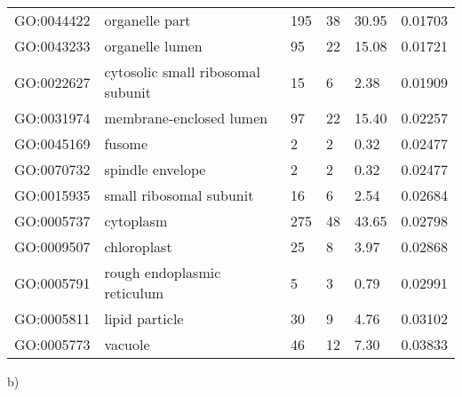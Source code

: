 \documentclass[10pt]{bmc_article}
\newenvironment{bmcformat}{\begin{raggedright}\baselineskip20pt\sloppy\setboolean{publ}{false}}{\end{raggedright}\baselineskip20pt\sloppy}
\begin{document}
\begin{bmcformat}
\begin{longtable}{lp{3cm}llll}
  GO:0044422 & organelle part & 195 &  38 & 30.95 & 0.01703 \\ 
  GO:0043233 & organelle lumen &  95 &  22 & 15.08 & 0.01721 \\ 
  GO:0022627 & cytosolic small ribosomal subunit &  15 &   6 & 2.38 & 0.01909 \\ 
  GO:0031974 & membrane-enclosed lumen &  97 &  22 & 15.40 & 0.02257 \\ 
   \hline
GO:0045169 & fusome &   2 &   2 & 0.32 & 0.02477 \\ 
  GO:0070732 & spindle envelope &   2 &   2 & 0.32 & 0.02477 \\ 
  GO:0015935 & small ribosomal subunit &  16 &   6 & 2.54 & 0.02684 \\ 
  GO:0005737 & cytoplasm & 275 &  48 & 43.65 & 0.02798 \\ 
  GO:0009507 & chloroplast &  25 &   8 & 3.97 & 0.02868 \\ 
  GO:0005791 & rough endoplasmic reticulum &   5 &   3 & 0.79 & 0.02991 \\ 
  GO:0005811 & lipid particle &  30 &   9 & 4.76 & 0.03102 \\ 
  GO:0005773 & vacuole &  46 &  12 & 7.30 & 0.03833 \\ 
   \hline
\hline
\end{longtable}
b)\\


\end{bmcformat}
\end{document}
